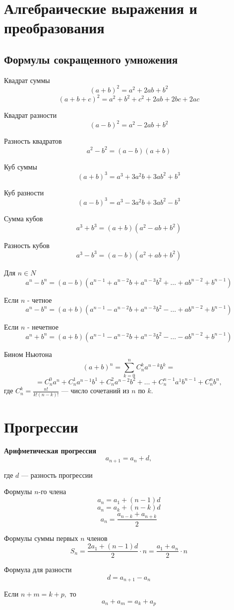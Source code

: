 \documentclass[a4paper, 14pt]{extarticle}
\begin{document}
{\section{Алгебраические выражения и преобразования}
\subsection{Формулы сокращенного умножения}

Квадрат суммы
$$ (a+b)^2=a^2+2ab+b^2$$
$$ (a+b+c)^2=a^2+b^2+c^2+2ab+2bc+2ac$$

Квадрат разности
$$(a-b)^2=a^2-2ab+b^2$$

Разность квадратов
$$a^2-b^2=(a-b)(a+b)$$

Куб суммы
$$(a+b)^3=a^3+3a^2b+3ab^2+b^3$$

Куб разности
$$(a-b)^3=a^3-3a^2b+3ab^2-b^3$$

Сумма кубов
$$a^3+b^3=(a+b)(a^2-ab+b^2)$$

Разность кубов
$$a^3-b^3=(a-b)(a^2+ab+b^2)$$

Для $n\in N$
$$a^n-b^n=(a-b)(a^{n-1}+a^{n-2}b+a^{n-3}b^2+\dots +ab^{n-2}+b^{n-1})$$

Если $n$ - четное
$$a^n-b^n=(a+b)(a^{n-1}-a^{n-2}b+a^{n-3}b^2-\dots +ab^{n-2}+b^{n-1})$$

Если $n$ - нечетное
$$a^n+b^n=(a+b)(a^{n-1}-a^{n-2}b+a^{n-3}b^2-\dots -ab^{n-2}+b^{n-1})$$

Бином Ньютона
$$(a+b)^n=\sum\limits_{k=0}^n C_n^ka^{n-k}b^k=$$
$$=C_n^0a^n+C_n^1a^{n-1}b^1+C_n^2a^{n-2}b^2+\dots +C_n^{n-1}a^1b^{n-1}+C_n^nb^n,$$
где $C_n^k=\frac{n!}{k!(n-k)!}$ --- число сочетаний из $n$ по $k.$






\section{Прогрессии}

\textbf{Арифметическая прогрессия}
$$a_{n+1}=a_n+d,$$ 

где $d$ --- разность  прогрессии

Формулы $n$-го члена
$$a_n=a_1+(n-1)d$$
$$a_n=a_k+(n-k)d$$
$$a_n=\frac{a_{n-k}+a_{n+k}}{2}$$

Формулы суммы первых $n$ членов
$$S_n=\frac{2a_1+(n-1)d}{2}\cdot n=\frac{a_1+a_n}{2}\cdot n$$

Формула для разности
$$d=a_{n+1}-a_n$$

Если $n+m=k+p,$ то
$$a_n+a_m=a_k+a_p$$

}
\end{document}
